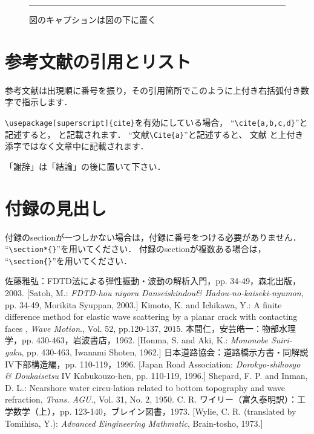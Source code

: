\documentclass{jjsce}
\begin{document}
\begin{figure}[htb]
\centering
\rule{20mm}{20mm}
\caption{図のキャプションは図の下に置く}
\label{fig:sample}
\end{figure}


\section{参考文献の引用とリスト}
参考文献は出現順に番号を振り，その引用箇所でこのように\cite{a}上付き右括弧付き数字で指示します．

\verb|\usepackage[superscript]{cite}|を有効にしている場合，
``\verb|\cite{a,b,c,d}|''と記述すると，
\cite{a,b,c,d} と記載されます．
``文献\verb|\Cite{a}|''と記述すると、
文献\Cite{a} と上付き添字ではなく文章中に記載されます．

\Acknowledgment %
「謝辞」は「結論」の後に置いて下さい．

\appendix
\section*{付録の見出し}
付録のsectionが一つしかない場合は，付録に番号をつける必要がありません．
``\verb|\section*{}|''を用いてください．
付録のsectionが複数ある場合は，
``\verb|\section{}|''を用いてください．

\begin{thebibliography}{9}
	佐藤雅弘：FDTD法による弾性振動・波動の解析入門，pp. 34-49，森北出版，2003. 
	[Satoh, M.: \textit{FDTD-hou niyoru Danseishindou\& Hadou-no-kaiseki-nyumon}, pp. 34-49, Morikita Syuppan, 2003.]
	Kimoto, K. and Ichikawa, Y.:
	A finite difference method for elastic wave scattering by a planar crack with contacting faces
	, \textit{Wave Motion}., Vol. 52, pp.120-137, 2015.
本間仁，安芸皓一：物部水理学，pp. 430-463，岩波書店，1962. [Honma, S. and Aki, K.: \textit{Mononobe Suiri-gaku}, pp. 430-463, Iwanami Shoten, 1962.]
日本道路協会：道路橋示方書・同解説IV下部構造編，pp. 110-119，1996. [Japan Road Association: \textit{Dorokyo-shihosyo \& Doukaisetsu} IV Kabukouzo-hen, pp. 110-119, 1996.]
Shepard, F. P. and Inman, D. L.: Nearshore water circu-lation related to bottom topography and wave refraction, \textit{Trans. AGU}., Vol. 31, No. 2, 1950.
C. R. ワイリー（富久泰明訳）：工学数学（上），pp. 123-140，ブレイン図書，1973. [Wylie, C. R. (translated by Tomihisa, Y.): \textit{Advanced Eingineering Mathmatic}, Brain-tosho, 1973.]
\end{thebibliography}
\end{document}
